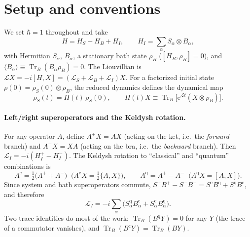 \documentclass[11pt]{article}
\newcommand{\Tr}{\operatorname{Tr}}
\newcommand{\Lc}{\mathcal{L}}
\newcommand{\ee}{\mathrm{e}}
\newcommand{\cl}{\mathrm{c}}
\newcommand{\qu}{\mathrm{q}}
\newcommand{\rhoS}{\rho_{S}}
\newcommand{\rhoB}{\rho_{B}}
\newcommand{\avg}[1]{\langle#1\rangle}
\begin{document}
\tableofcontents

\section{Setup and conventions}
\label{sec:setup}

We set $\hbar=1$ throughout and take
\begin{equation}
  H = H_S + H_B + H_I,\qquad H_I=\sum_\alpha S_\alpha\otimes B_\alpha ,
\end{equation}
with Hermitian $S_\alpha$, $B_\alpha$, a stationary bath state $\rhoB$ ($[H_B,\rhoB]=0$),
and $\avg{B_\alpha}\equiv\Tr_B(B_\alpha\rhoB)=0$. The Liouvillian is
$\Lc X=-i[H,X]=(\Lc_S+\Lc_B+\Lc_I)X$. For a factorized initial state
$\rho(0)=\rhoS(0)\otimes\rhoB$, the reduced dynamics defines the dynamical map
\begin{equation}
  \rhoS(t)=\Pi(t)\,\rhoS(0),\qquad \Pi(t)X\equiv\Tr_B\!\big[\ee^{\Lc t}(X\otimes\rhoB)\big].
  \label{eq:map}
\end{equation}

\paragraph{Left/right superoperators and the Keldysh rotation.}
For any operator $A$, define $A^{+}X=AX$ (acting on the ket, i.e.\ the \emph{forward}
branch) and $A^{-}X=XA$ (acting on the bra, i.e.\ the \emph{backward} branch). Then
$\Lc_I=-i(H_I^{+}-H_I^{-})$. The Keldysh rotation to ``classical'' and ``quantum''
combinations is
\begin{equation}
  A^{\cl}=\tfrac12\big(A^{+}+A^{-}\big)\;\;\big(A^{\cl}X=\tfrac12\{A,X\}\big),\qquad
  A^{\qu}=A^{+}-A^{-}\;\;\big(A^{\qu}X=[A,X]\big).
  \label{eq:rotation}
\end{equation}
Since system and bath superoperators commute,
$S^+B^+-S^-B^-=S^{\cl}B^{\qu}+S^{\qu}B^{\cl}$, and therefore
\begin{equation}
  \boxed{\;\Lc_I=-i\sum_\alpha\big(S^{\qu}_\alpha B^{\cl}_\alpha+S^{\cl}_\alpha B^{\qu}_\alpha\big).\;}
  \label{eq:LIcq}
\end{equation}
Two trace identities do most of the work: $\Tr_B(B^{\qu}Y)=0$ for any $Y$ (the trace of a
commutator vanishes), and $\Tr_B(B^{\cl}Y)=\Tr_B(BY)$.
\end{document}
